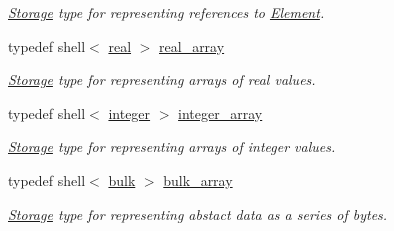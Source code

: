 \begin{DoxyCompactItemize}
\begin{DoxyCompactList}\small\item\em \hyperlink{classINMOST_1_1Storage}{Storage} type for representing references to \hyperlink{classINMOST_1_1Element}{Element}. \end{DoxyCompactList}\item 
\hypertarget{classINMOST_1_1Storage_a430e5358d435befb38169beef593527e}{typedef shell$<$ \hyperlink{classINMOST_1_1Storage_a853346784b4a5822a7fac54d8f10f805}{real} $>$ \hyperlink{classINMOST_1_1Storage_a430e5358d435befb38169beef593527e}{real\-\_\-array}}\label{classINMOST_1_1Storage_a430e5358d435befb38169beef593527e}

\begin{DoxyCompactList}\small\item\em \hyperlink{classINMOST_1_1Storage}{Storage} type for representing arrays of real values. \end{DoxyCompactList}\item 
\hypertarget{classINMOST_1_1Storage_a4d1637367f0487eb778894b57fc94647}{typedef shell$<$ \hyperlink{classINMOST_1_1Storage_aec96942bc647417a801e2895b45964d2}{integer} $>$ \hyperlink{classINMOST_1_1Storage_a4d1637367f0487eb778894b57fc94647}{integer\-\_\-array}}\label{classINMOST_1_1Storage_a4d1637367f0487eb778894b57fc94647}

\begin{DoxyCompactList}\small\item\em \hyperlink{classINMOST_1_1Storage}{Storage} type for representing arrays of integer values. \end{DoxyCompactList}\item 
\hypertarget{classINMOST_1_1Storage_a6e49b2a38cb55dd59529bd23e8b1b852}{typedef shell$<$ \hyperlink{classINMOST_1_1Storage_ae429556af77094077d212e0ac23c8cfc}{bulk} $>$ \hyperlink{classINMOST_1_1Storage_a6e49b2a38cb55dd59529bd23e8b1b852}{bulk\-\_\-array}}\label{classINMOST_1_1Storage_a6e49b2a38cb55dd59529bd23e8b1b852}

\begin{DoxyCompactList}\small\item\em \hyperlink{classINMOST_1_1Storage}{Storage} type for representing abstact data as a series of bytes. \end{DoxyCompactList}\end{DoxyCompactItemize}
